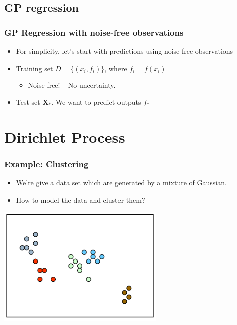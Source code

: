 \documentclass{beamer}
\begin{document}
\subsection{GP regression}
\begin{frame}
	\frametitle{GP Regression with noise-free observations}
	\begin{itemize}
			\item For simplicity, let's start with predictions using noise free observations
			\item Training set $D=\{(x_i, f_i)\}$, where $f_i=f(x_i)$
				\begin{itemize}
					\item Noise free! -- No uncertainty.
				\end{itemize}
			\item Test set $\mathbf{X_*}$. We want to predict outputs $f_*$
	\end{itemize}
\end{frame}

\section{Dirichlet Process}
\begin{frame}
	\frametitle{Example: Clustering}
	\begin{itemize}
		\item We're give a data set which are generated by a mixture of Gaussian.
		\item How to model the data and cluster them?
	\end{itemize}
	\centering
	\includegraphics[width=0.6\textwidth]{img/motive.png}
\end{frame}
\end{document}
